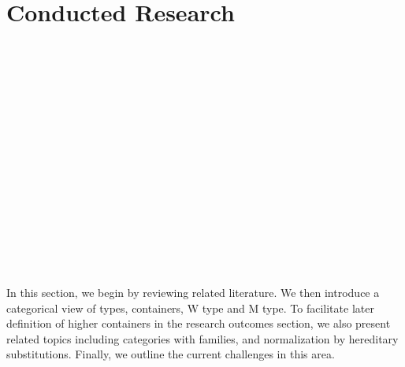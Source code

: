\chapter{Conducted Research}

\begin{code}[hide]%
\>[0]\AgdaSymbol{\{-\#}\AgdaSpace{}%
\AgdaSpace{}%
\AgdaSpace{}%
\AgdaSymbol{\#-\}}\<%
\\
%
\\[\AgdaEmptyExtraSkip]%
\>[0]\AgdaSpace{}%
\AgdaSpace{}%
\<%
\\
\>[0]\AgdaSpace{}%
\AgdaSpace{}%
\<%
\\
\>[0]\AgdaSpace{}%
\AgdaSpace{}%
\<%
\\
\>[0]\AgdaSpace{}%
\AgdaSpace{}%
\<%
\\
\>[0]\AgdaSpace{}%
\AgdaSpace{}%
\<%
\\
\>[0]\AgdaSpace{}%
\AgdaSpace{}%
\<%
\\
%
\\[\AgdaEmptyExtraSkip]%
\>[0]\AgdaSpace{}%
\AgdaSymbol{:}\AgdaSpace{}%
\<%
\\
\>[0]\AgdaSpace{}%
\AgdaSymbol{=}\AgdaSpace{}%
\<%
\\
%
\\[\AgdaEmptyExtraSkip]%
\>[0]\AgdaSpace{}%
\AgdaSymbol{:}\AgdaSpace{}%
\<%
\\
\>[0]\AgdaSpace{}%
\AgdaSymbol{=}\AgdaSpace{}%
\<%
\\
%
\\[\AgdaEmptyExtraSkip]%
\>[0]\AgdaSpace{}%
\AgdaSpace{}%
\AgdaSpace{}%
\AgdaSpace{}%
\AgdaSymbol{:}\AgdaSpace{}%
\<%
\end{code}

In this section, we begin by reviewing related literature. We then introduce a categorical view of types, containers, W type and M type. To facilitate later definition of higher containers in the research outcomes section, we also present related topics including categories with families, and normalization by hereditary substitutions. Finally, we outline the current challenges in this area.

